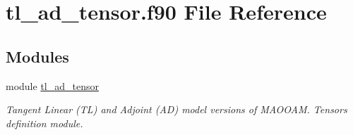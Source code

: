 \hypertarget{tl__ad__tensor_8f90}{}\section{tl\+\_\+ad\+\_\+tensor.\+f90 File Reference}
\label{tl__ad__tensor_8f90}
\subsection*{Modules}
\begin{DoxyCompactItemize}
\item 
module \hyperlink{namespacetl__ad__tensor}{tl\+\_\+ad\+\_\+tensor}
\begin{DoxyCompactList}\small\item\em Tangent Linear (TL) and Adjoint (AD) model versions of M\+A\+O\+O\+AM. Tensors definition module. \end{DoxyCompactList}\end{DoxyCompactItemize}
